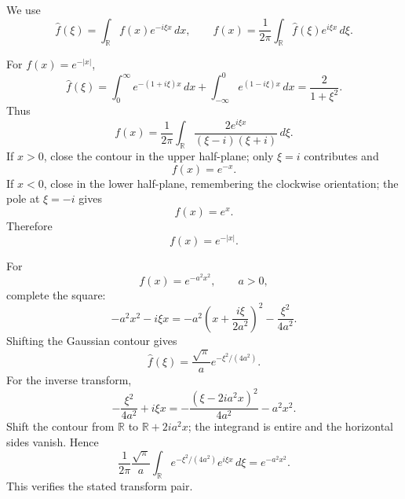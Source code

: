 

\begin{solution}
We use
\[
\widehat f(\xi)
=
\int_{\mathbb R}f(x)e^{-i\xi x}\,dx,
\qquad
f(x)
=
\frac1{2\pi}
\int_{\mathbb R}\widehat f(\xi)e^{i\xi x}\,d\xi.
\]

For \(f(x)=e^{-|x|}\),
\[
\widehat f(\xi)
=
\int_0^\infty e^{-(1+i\xi)x}\,dx
+
\int_{-\infty}^0e^{(1-i\xi)x}\,dx
=
\frac{2}{1+\xi^2}.
\]
Thus
\[
f(x)
=
\frac1{2\pi}
\int_{\mathbb R}\frac{2e^{i\xi x}}{(\xi-i)(\xi+i)}\,d\xi.
\]
If \(x>0\), close the contour in the upper half-plane; only \(\xi=i\) contributes and
\[
f(x)=e^{-x}.
\]
If \(x<0\), close in the lower half-plane, remembering the clockwise orientation; the pole at \(\xi=-i\) gives
\[
f(x)=e^x.
\]
Therefore
\[
\boxed{f(x)=e^{-|x|}}.
\]

For
\[
f(x)=e^{-a^2x^2},
\qquad a>0,
\]
complete the square:
\[
-a^2x^2-i\xi x
=
-a^2\left(x+\frac{i\xi}{2a^2}\right)^2
-\frac{\xi^2}{4a^2}.
\]
Shifting the Gaussian contour gives
\[
\boxed{
\widehat f(\xi)
=
\frac{\sqrt\pi}{a}
e^{-\xi^2/(4a^2)}.
}
\]
For the inverse transform,
\[
-\frac{\xi^2}{4a^2}+i\xi x
=
-\frac{(\xi-2ia^2x)^2}{4a^2}
-a^2x^2.
\]
Shift the contour from \(\mathbb R\) to \(\mathbb R+2ia^2x\); the integrand is entire and the horizontal sides vanish. Hence
\[
\frac1{2\pi}\frac{\sqrt\pi}{a}
\int_{\mathbb R}
e^{-\xi^2/(4a^2)}e^{i\xi x}\,d\xi
=
e^{-a^2x^2}.
\]
This verifies the stated transform pair.
\end{solution}


